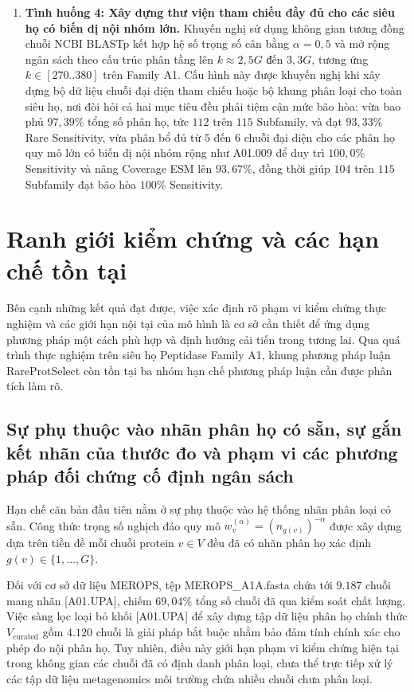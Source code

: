 \begin{enumerate}
    \item \textbf{Tình huống 4: Xây dựng thư viện tham chiếu đầy đủ cho các siêu họ có biến dị nội nhóm lớn.} Khuyến nghị sử dụng không gian tương đồng chuỗi NCBI BLASTp kết hợp hệ số trọng số cân bằng $\alpha = 0{,}5$ và mở rộng ngân sách theo cấu trúc phân tầng lên $k \approx 2{,}5G \text{ đến } 3{,}3G$, tương ứng $k \in [270..380]$ trên Family A1. Cấu hình này được khuyến nghị khi xây dựng bộ dữ liệu chuỗi đại diện tham chiếu hoặc bộ khung phân loại cho toàn siêu họ, nơi đòi hỏi cả hai mục tiêu đều phải tiệm cận mức bão hòa: vừa bao phủ $97{,}39\%$ tổng số phân họ, tức $112$ trên $115$ Subfamily, và đạt $93{,}33\%$ Rare Sensitivity, vừa phân bổ đủ từ $5$ đến $6$ chuỗi đại diện cho các phân họ quy mô lớn có biến dị nội nhóm rộng như A01.009 để duy trì $100{,}0\%$ Sensitivity và nâng Coverage ESM lên $93{,}67\%$, đồng thời giúp $104$ trên $115$ Subfamily đạt bão hòa $100\%$ Sensitivity.
\end{enumerate}

\section{Ranh giới kiểm chứng và các hạn chế tồn tại}
\label{sec:conc_limitations}

Bên cạnh những kết quả đạt được, việc xác định rõ phạm vi kiểm chứng thực nghiệm và các giới hạn nội tại của mô hình là cơ sở cần thiết để ứng dụng phương pháp một cách phù hợp và định hướng cải tiến trong tương lai. Qua quá trình thực nghiệm trên siêu họ Peptidase Family A1, khung phương pháp luận RareProtSelect còn tồn tại ba nhóm hạn chế phương pháp luận cần được phân tích làm rõ.

\subsection{Sự phụ thuộc vào nhãn phân họ có sẵn, sự gắn kết nhãn của thước đo và phạm vi các phương pháp đối chứng cố định ngân sách}
\label{subsec:lim_unassigned_upa}

Hạn chế căn bản đầu tiên nằm ở sự phụ thuộc vào hệ thống nhãn phân loại có sẵn. Công thức trọng số nghịch đảo quy mô $w_v^{(\alpha)} = (n_{g(v)})^{-\alpha}$ được xây dựng dựa trên tiền đề mỗi chuỗi protein $v \in V$ đều đã có nhãn phân họ xác định $g(v) \in \{1, \dots, G\}$. 

Đối với cơ sở dữ liệu MEROPS, tệp MEROPS\_A1A.fasta chứa tới $9.187$ chuỗi mang nhãn [A01.UPA], chiếm $69{,}04\%$ tổng số chuỗi đã qua kiểm soát chất lượng. Việc sàng lọc loại bỏ khối [A01.UPA] để xây dựng tập dữ liệu phân họ chính thức $V_{\text{curated}}$ gồm $4.120$ chuỗi là giải pháp bắt buộc nhằm bảo đảm tính chính xác cho phép đo nội phân họ. Tuy nhiên, điều này giới hạn phạm vi kiểm chứng hiện tại trong không gian các chuỗi đã có định danh phân loại, chưa thể trực tiếp xử lý các tập dữ liệu metagenomics môi trường chứa nhiều chuỗi chưa phân loại.

